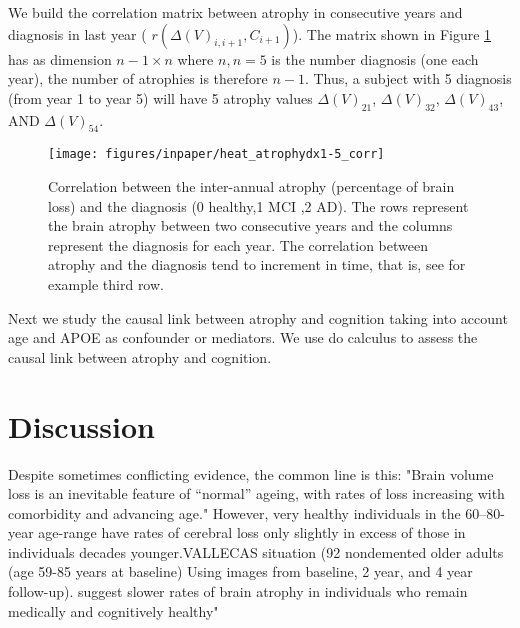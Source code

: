 \documentclass[twoside,onecolumn]{article}
\begin{document}
We build the correlation matrix between atrophy in consecutive years and diagnosis in last year ( $r(\Delta(V)_{i,i+1},C_{i+1})$). The matrix shown in Figure \ref{fig:heatmap_atro_dx} has as dimension $n-1 \times n$ where $n, n=5$ is the number diagnosis (one each year), the number of atrophies is therefore $n-1$. Thus, a subject with 5 diagnosis (from year 1 to year 5) will have 5 atrophy values $\Delta(V)_{21}$, $\Delta(V)_{32}$, $\Delta(V)_{43}$, AND $\Delta(V)_{54}$. 

\begin{figure}[!hbt]
        \centering
        \texttt{[image: figures/inpaper/heat\_atrophydx1-5\_corr]}
        \caption{Correlation between the inter-annual atrophy (percentage of brain loss) and the diagnosis (0 healthy,1 MCI ,2 AD). The rows represent the brain atrophy between two consecutive years and the columns represent the diagnosis for each year. The correlation between atrophy and the diagnosis tend to increment in time, that is, see for example third row.} 
        \label{fig:heatmap_atro_dx}
\end{figure}





Next we study the causal link between atrophy and cognition taking into account age and APOE as confounder or mediators.
We use do calculus to assess the causal link between atrophy and cognition.


\section{Discussion}
Despite sometimes conflicting evidence, the common line is this: "Brain volume loss is an inevitable feature of “normal” ageing, with rates of loss increasing with comorbidity and advancing age." However, very healthy individuals in the 60–80-year age-range have rates of cerebral loss only slightly in excess of those in individuals decades younger.VALLECAS situation \cite{resnick2003longitudinal} (92 nondemented older adults (age 59-85 years at baseline) Using images from baseline, 2 year, and 4 year follow-up).  suggest slower rates of brain atrophy in individuals who remain medically and cognitively healthy"
\end{document}
